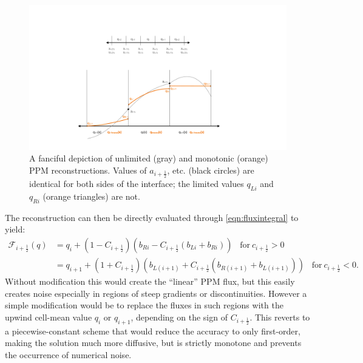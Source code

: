 \documentclass[10pt,letterpaper,margin=1in]{memoir}
\newcommand{\half}{\frac{1}{2}}
\begin{document}
\begin{figure}[tbp]
   \centering
   \includegraphics[scale=0.35]{gridmetricsReconstructions.pdf} %
   \caption{A fanciful depiction of unlimited (gray) and monotonic (orange) PPM reconstructions. Values of $a_{i+\half}$, etc. (black circles) are identical for both sides of the interface; the limited values $q_{Li}$ and $q_{Ri}$ (orange triangles) are not. }
   \label{fig:gridmetricsReconstructions}
\end{figure}

The reconstruction can then be directly evaluated through \eqref{eqn:fluxintegral} to yield:
\begin{equation} \label{eqn:linearfluxes}
\begin{split}
\mathcal{F}_{i+\half}(q) &= q_{i} + \left (1 - C_{i+\half} \right ) \left ( b_{Ri} - C_{i+\half} \left ( b_{Li} + b_{Ri} \right )  \right )  \;\;\; \mathrm{for\ }c_{i+\half} > 0 \\
 &= q_{i+1} + \left (1 + C_{i+\half} \right ) \left ( b_{L\left(i+1\right)} + C_{i+\half} \left ( b_{R\left(i+1\right)} + b_{L\left(i+1\right)} \right )  \right ) \;\;\; \mathrm{for\ } c_{i+\half} < 0 .
\end{split}
\end{equation}
Without modification this would create the ``linear'' PPM flux, but this easily creates noise especially in regions of steep gradients or discontinuities. However a simple modification would be to replace the fluxes in such regions with the upwind cell-mean value $q_i$ or $q_{i+1}$, depending on the sign of $C_{i+\half}$. This reverts to a piecewise-constant scheme that would reduce the accuracy to only first-order, making the solution much more diffusive, but is strictly monotone and prevents the occurrence of numerical noise. 
\end{document}
